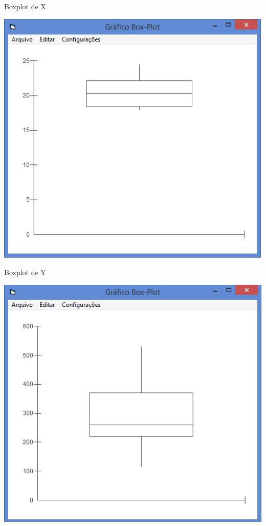 \documentclass{beamer}
\begin{document}
\begin{frame}{Boxplot de X}
  \begin{center}
    \includegraphics[height=0.9\textheight]{Pratica_Desc/boxplot_x}
  \end{center}
\end{frame}

\begin{frame}{Boxplot de Y}
  \begin{center}
    \includegraphics[height=0.9\textheight]{Pratica_Desc/boxplot_y}
  \end{center}
\end{frame}
\end{document}

